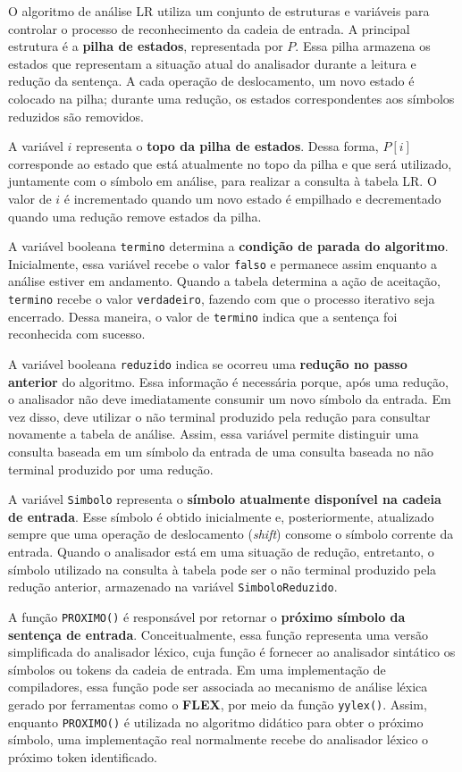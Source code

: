 \documentclass[
  brazilian,
  letterpaper,
]{book}
\theoremstyle{plain}
\theoremstyle{definition}
\theoremstyle{remark}
\begin{document}
O algoritmo de análise LR utiliza um conjunto de estruturas e variáveis
para controlar o processo de reconhecimento da cadeia de entrada. A
principal estrutura é a \textbf{pilha de estados}, representada por
\(P\). Essa pilha armazena os estados que representam a situação atual
do analisador durante a leitura e redução da sentença. A cada operação
de deslocamento, um novo estado é colocado na pilha; durante uma
redução, os estados correspondentes aos símbolos reduzidos são
removidos.

A variável \(i\) representa o \textbf{topo da pilha de estados}. Dessa
forma, \(P[i]\) corresponde ao estado que está atualmente no topo da
pilha e que será utilizado, juntamente com o símbolo em análise, para
realizar a consulta à tabela LR. O valor de \(i\) é incrementado quando
um novo estado é empilhado e decrementado quando uma redução remove
estados da pilha.

A variável booleana \texttt{termino} determina a \textbf{condição de
parada do algoritmo}. Inicialmente, essa variável recebe o valor
\texttt{falso} e permanece assim enquanto a análise estiver em
andamento. Quando a tabela determina a ação de aceitação,
\texttt{termino} recebe o valor \texttt{verdadeiro}, fazendo com que o
processo iterativo seja encerrado. Dessa maneira, o valor de
\texttt{termino} indica que a sentença foi reconhecida com sucesso.

A variável booleana \texttt{reduzido} indica se ocorreu uma
\textbf{redução no passo anterior} do algoritmo. Essa informação é
necessária porque, após uma redução, o analisador não deve imediatamente
consumir um novo símbolo da entrada. Em vez disso, deve utilizar o não
terminal produzido pela redução para consultar novamente a tabela de
análise. Assim, essa variável permite distinguir uma consulta baseada em
um símbolo da entrada de uma consulta baseada no não terminal produzido
por uma redução.

A variável \texttt{Simbolo} representa o \textbf{símbolo atualmente
disponível na cadeia de entrada}. Esse símbolo é obtido inicialmente e,
posteriormente, atualizado sempre que uma operação de deslocamento
(\emph{shift}) consome o símbolo corrente da entrada. Quando o
analisador está em uma situação de redução, entretanto, o símbolo
utilizado na consulta à tabela pode ser o não terminal produzido pela
redução anterior, armazenado na variável \texttt{SimboloReduzido}.

A função \texttt{PROXIMO()} é responsável por retornar o \textbf{próximo
símbolo da sentença de entrada}. Conceitualmente, essa função representa
uma versão simplificada do analisador léxico, cuja função é fornecer ao
analisador sintático os símbolos ou tokens da cadeia de entrada. Em uma
implementação de compiladores, essa função pode ser associada ao
mecanismo de análise léxica gerado por ferramentas como o \textbf{FLEX},
por meio da função \texttt{yylex()}. Assim, enquanto \texttt{PROXIMO()}
é utilizada no algoritmo didático para obter o próximo símbolo, uma
implementação real normalmente recebe do analisador léxico o próximo
token identificado.
\end{document}
